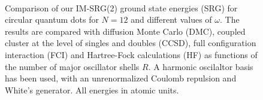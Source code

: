\documentclass[amsmath, amssymb, aps, floatfix, nofootinbib, preprintnumbers,showpacs, superscriptaddress, twocolumn]{revtex4-1}
\begin{document}
\begin{figure}%
     \begin{center}
        \\ %
    \end{center}
    \caption{Comparison of our IM-SRG(2) ground state energies (SRG)
      for circular quantum dots for $N=12$ and different values of
      $\omega$. The results are compared with diffusion Monte
      Carlo (DMC), coupled cluster at the level of singles and doubles
      (CCSD), full configuration interaction (FCI) and Hartree-Fock
      calculations (HF) as functions of the number of major oscillator
      shells $R$. A harmonic oscilaltor basis has been used, with an
      unrenormalized Coulomb repulsion and White's generator. All
      energies in atomic units.}
   \label{fig:N12}
\end{figure}
\end{document}
